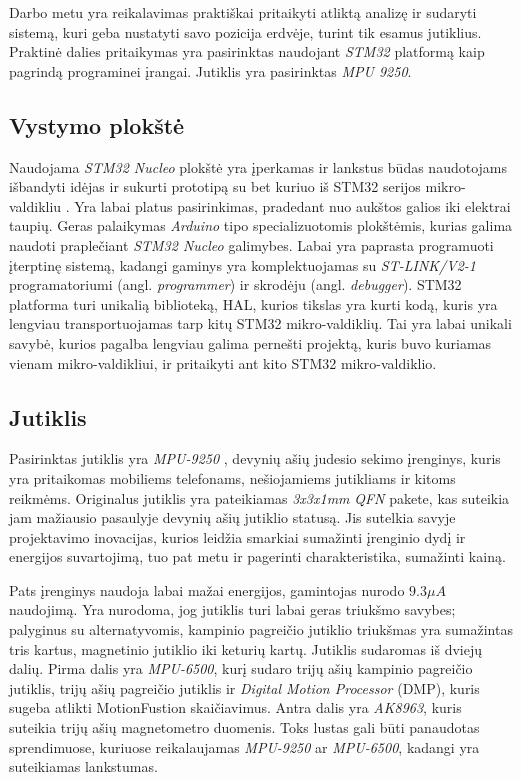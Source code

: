Darbo metu yra reikalavimas praktiškai pritaikyti atliktą analizę ir sudaryti sistemą, kuri geba nustatyti savo pozicija erdvėje, turint tik esamus jutiklius. 
Praktinė dalies pritaikymas yra pasirinktas naudojant \textit{STM32} platformą kaip pagrindą programinei įrangai. 
Jutiklis yra pasirinktas \textit{MPU 9250}.

\subsection{Vystymo plokštė}

Naudojama \textit{STM32 Nucleo} plokštė yra įperkamas ir lankstus būdas naudotojams išbandyti idėjas ir sukurti prototipą su bet kuriuo iš STM32 serijos mikro-valdikliu \cite{STM3258:online}. 
Yra labai platus pasirinkimas, pradedant nuo aukštos galios iki elektrai taupių. 
Geras palaikymas \textit{Arduino} tipo specializuotomis plokštėmis, kurias galima naudoti praplečiant \textit{STM32 Nucleo} galimybes. 
Labai yra paprasta programuoti įterptinę sistemą, kadangi gaminys yra komplektuojamas su \textit{ST-LINK/V2-1} programatoriumi (angl. \textit{programmer}) ir skrodėju (angl. \textit{debugger}).
STM32 platforma turi unikalią biblioteką, HAL, kurios tikslas yra kurti kodą, kuris yra lengviau transportuojamas tarp kitų STM32 mikro-valdiklių.
Tai yra labai unikali savybė, kurios pagalba lengviau galima pernešti projektą, kuris buvo kuriamas vienam mikro-valdikliui, ir pritaikyti ant kito STM32 mikro-valdiklio.

\subsection{Jutiklis}

Pasirinktas jutiklis yra \textit{MPU-9250} \cite{MPU-96:online}, devynių ašių judesio sekimo įrenginys, kuris yra pritaikomas mobiliems telefonams, nešiojamiems jutikliams ir kitoms reikmėms.
Originalus  jutiklis yra pateikiamas \textit{3x3x1mm} \textit{QFN} pakete, kas suteikia jam mažiausio pasaulyje devynių ašių jutiklio statusą.
Jis sutelkia savyje projektavimo inovacijas, kurios leidžia smarkiai sumažinti įrenginio dydį ir energijos suvartojimą, tuo pat metu ir pagerinti charakteristika, sumažinti kainą.

Pats įrenginys naudoja labai mažai energijos, gamintojas nurodo $9.3\mu A$ naudojimą. 
Yra nurodoma, jog jutiklis turi labai geras triukšmo savybes; palyginus su alternatyvomis, kampinio pagreičio jutiklio triukšmas yra sumažintas tris kartus, magnetinio jutiklio iki keturių kartų.
Jutiklis sudaromas iš dviejų dalių.
Pirma dalis yra \textit{MPU-6500}, kurį sudaro trijų ašių kampinio pagreičio jutiklis, trijų ašių pagreičio jutiklis ir \textit{Digital Motion Processor} (DMP), kuris sugeba atlikti MotionFustion skaičiavimus.
Antra dalis yra \textit{AK8963}, kuris suteikia trijų ašių magnetometro duomenis. 
Toks lustas gali būti panaudotas sprendimuose, kuriuose reikalaujamas \textit{MPU-9250} ar \textit{MPU-6500}, kadangi yra suteikiamas lankstumas.

